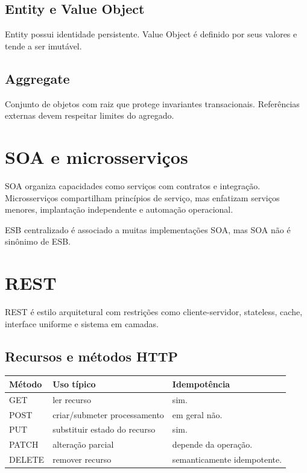 \subsection{Entity e Value Object}

Entity possui identidade persistente. Value Object é definido por seus valores e tende a ser imutável.

\subsection{Aggregate}

Conjunto de objetos com raiz que protege invariantes transacionais. Referências externas devem respeitar limites do agregado.

\section{SOA e microsserviços}

SOA organiza capacidades como serviços com contratos e integração. Microsserviços compartilham princípios de serviço, mas enfatizam serviços menores, implantação independente e automação operacional.

ESB centralizado é associado a muitas implementações SOA, mas SOA não é sinônimo de ESB.

\section{REST}

REST é estilo arquitetural com restrições como cliente-servidor, stateless, cache, interface uniforme e sistema em camadas.

\subsection{Recursos e métodos HTTP}

\begin{table}[ht]
\centering
\small
\begin{tabularx}{\textwidth}{l X X}
\toprule
Método & Uso típico & Idempotência \\
\midrule
GET & ler recurso & sim. \\
POST & criar/submeter processamento & em geral não. \\
PUT & substituir estado do recurso & sim. \\
PATCH & alteração parcial & depende da operação. \\
DELETE & remover recurso & semanticamente idempotente. \\
\bottomrule
\end{tabularx}
\end{table}

